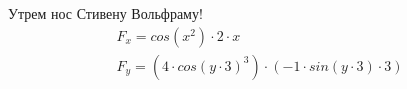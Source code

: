 \documentclass{article}
\begin{document}
\par Утрем нос Стивену Вольфраму!
\begin{gather*}
F_{x} = cos\left(x ^ {2}\right) \cdot 2 \cdot x\\
F_{y} = \left(4 \cdot cos\left(y \cdot 3\right) ^ {3}\right) \cdot \left(-1 \cdot sin\left(y \cdot 3\right) \cdot 3\right)\\
\end{gather*}
\end{document}
